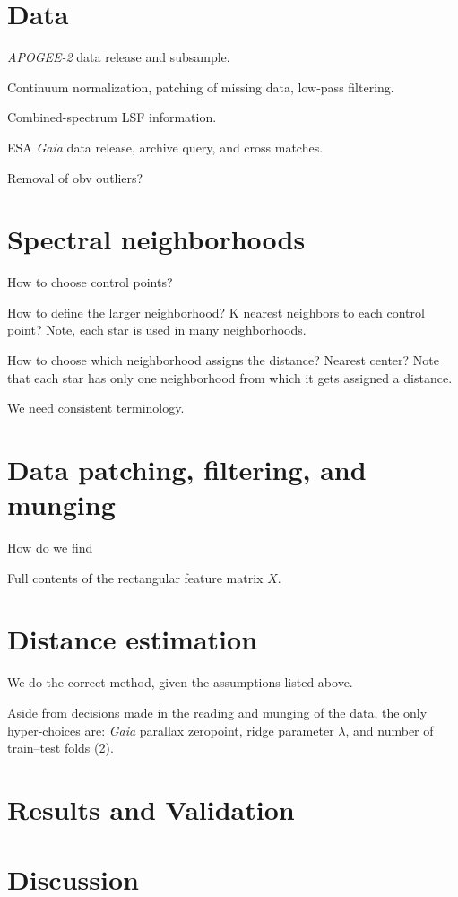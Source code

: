 \documentclass[modern]{aastex631}
\newcommand{\acronym}[1]{{\small{#1}}}
\newcommand{\project}[1]{\textsl{#1}}
\newcommand{\ESA}{\acronym{ESA}}
\newcommand{\Gaia}{\project{Gaia}}
\newcommand{\APOGEE}{\project{\acronym{APOGEE-2}}}
\begin{document}
\section{Data}

\APOGEE{} data release and subsample.

Continuum normalization, patching of missing data, low-pass filtering.

Combined-spectrum LSF information.

\ESA{} \Gaia{} data release, archive query, and cross matches.

Removal of obv outliers?

\section{Spectral neighborhoods}

How to choose control points?

How to define the larger neighborhood? K nearest neighbors to each control point? Note, each star is used in many neighborhoods.

How to choose which neighborhood assigns the distance? Nearest center? Note that each star has only one neighborhood from which it gets assigned a distance.

We need consistent terminology.

\section{Data patching, filtering, and munging}

How do we find

Full contents of the rectangular feature matrix $X$.

\section{Distance estimation}

We do the correct method, given the assumptions listed above.

Aside from decisions made in the reading and munging of the data, the
only hyper-choices are: \Gaia{} parallax zeropoint, ridge parameter
$\lambda$, and number of train--test folds (2).

\section{Results and Validation}

\section{Discussion}
\end{document}
